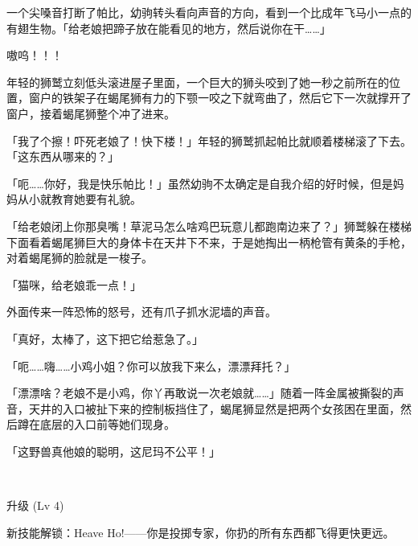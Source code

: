 一个尖嗓音打断了帕比，幼驹转头看向声音的方向，看到一个比成年飞马小一点的有翅生物。「给老娘把蹄子放在能看见的地方，然后说你在干……」

嗷呜！！！

年轻的狮鹫立刻低头滚进屋子里面，一个巨大的狮头咬到了她一秒之前所在的位置，窗户的铁架子在蝎尾狮有力的下颚一咬之下就弯曲了，然后它下一次就撑开了窗户，接着蝎尾狮整个冲了进来。

「我了个擦！吓死老娘了！快下楼！」年轻的狮鹫抓起帕比就顺着楼梯滚了下去。「这东西从哪来的？」

「呃……你好，我是快乐帕比！」虽然幼驹不太确定是自我介绍的好时候，但是妈妈从小就教育她要有礼貌。

「给老娘闭上你那臭嘴！草泥马怎么啥鸡巴玩意儿都跑南边来了？」狮鹫躲在楼梯下面看着蝎尾狮巨大的身体卡在天井下不来，于是她掏出一柄枪管有黄条的手枪，对着蝎尾狮的脸就是一梭子。

「猫咪，给老娘乖一点！」

外面传来一阵恐怖的怒号，还有爪子抓水泥墙的声音。

「真好，太棒了，这下把它给惹急了。」

「呃……嗨……小鸡小姐？你可以放我下来么，漂漂拜托？」

「漂漂啥？老娘不是小鸡，你丫再敢说一次老娘就……」随着一阵金属被撕裂的声音，天井的入口被扯下来的控制板挡住了，蝎尾狮显然是把两个女孩困在里面，然后蹲在底层的入口前等她们现身。

「这野兽真他娘的聪明，这尼玛不公平！」

~\vfill

\begin{note}
    升级 (Lv 4)

    新技能解锁：Heave Ho!——你是投掷专家，你扔的所有东西都飞得更快更远。
\end{note}



